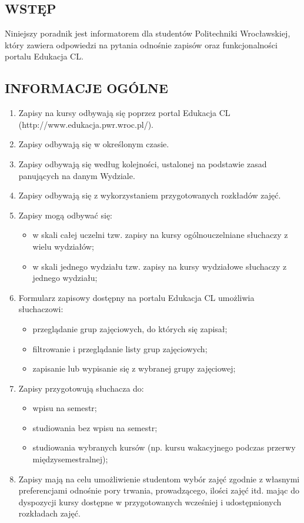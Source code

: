 \documentclass[11pt]{article}
\begin{document}
\subsection{WSTĘP}
\indent \hspace{0.5cm} Niniejszy poradnik jest informatorem dla studentów Politechniki Wrocławskiej, który zawiera odpowiedzi na pytania odnośnie zapisów oraz funkcjonalności portalu Edukacja CL.
\subsection{INFORMACJE OGÓLNE}
\begin{enumerate}
\item Zapisy na kursy odbywają się poprzez portal Edukacja CL (http://www.edukacja.pwr.wroc.pl/).
\item Zapisy odbywają się w określonym czasie.
\item Zapisy odbywają się według kolejności, ustalonej na podstawie zasad panujących na danym Wydziale.
\item Zapisy odbywają się z wykorzystaniem przygotowanych rozkładów zajęć.
\item Zapisy mogą odbywać się:
\begin{itemize}
\item w skali całej uczelni tzw. zapisy na kursy ogólnouczelniane słuchaczy z wielu wydziałów;
\item w skali jednego wydziału tzw. zapisy na kursy wydziałowe słuchaczy z jednego wydziału;
\end{itemize}
\item Formularz zapisowy dostępny na portalu Edukacja CL umożliwia słuchaczowi:
\begin{itemize}
    \item przeglądanie grup zajęciowych, do których się zapisał;
    \item filtrowanie i przeglądanie listy grup zajęciowych;
    \item zapisanie lub wypisanie się z wybranej grupy zajęciowej;
\end{itemize}
\item Zapisy przygotowują słuchacza do:
\begin{itemize}
    \item wpisu na semestr;
    \item studiowania bez wpisu na semestr;
    \item studiowania wybranych kursów (np. kursu wakacyjnego podczas przerwy międzysemestralnej);
\end{itemize}
\item Zapisy mają na celu umożliwienie studentom wybór zajęć zgodnie z własnymi preferencjami odnośnie pory trwania, prowadzącego, ilości zajęć itd. mając do dyspozycji kursy dostępne w przygotowanych wcześniej i udostępnionych rozkładach zajęć.
\end{enumerate}
\end{document}
